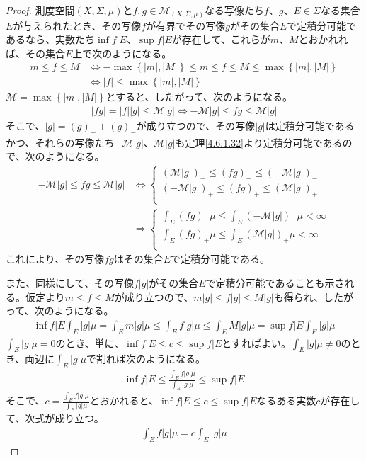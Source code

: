 \documentclass[dvipdfmx]{jsarticle}
\begin{document}
\begin{proof}
測度空間$(X,\varSigma,\mu)$と$f,g \in \mathcal{M}_{(X,\varSigma,\mu)}$なる写像たち$f$、$g$、$E \in \varSigma$なる集合$E$が与えられたとき、その写像$f$が有界でその写像$g$がその集合$E$で定積分可能であるなら、実数たち$\inf{f|E}$、$\sup{f|E}$が存在して、これらが$m$、$M$とおかれれば、その集合$E$上で次のようになる。
\begin{align*}
m \leq f \leq M &\Leftrightarrow - \max\left\{ |m|,|M| \right\} \leq m \leq f \leq M \leq \max\left\{ |m|,|M| \right\}\\
&\Leftrightarrow |f| \leq \max\left\{ |m|,|M| \right\}
\end{align*}
$\mathcal{M}=\max\left\{ |m|,|M| \right\}$とすると、したがって、次のようになる。
\begin{align*}
|fg| = |f||g|\mathcal{\leq M}|g|\mathcal{\Leftrightarrow - M}|g| \leq fg\mathcal{\leq M}|g|
\end{align*}
そこで、$|g| = (g)_{+} + (g)_{-}$が成り立つので、その写像$|g|$は定積分可能であるかつ、それらの写像たち$\mathcal{- M}|g|$、$\mathcal{M}|g|$も定理\ref{4.6.1.32}より定積分可能であるので、次のようになる。
\begin{align*}
-\mathcal{M}|g| \leq fg\mathcal{\leq M}|g| &\Leftrightarrow \left\{ \begin{matrix}
\left( \mathcal{M}|g| \right)_{-} \leq (fg)_{-} \leq \left( \mathcal{- M}|g| \right)_{-} \\
\left( - \mathcal{M}|g| \right)_{+} \leq (fg)_{+} \leq \left( \mathcal{M}|g| \right)_{+} \\
\end{matrix} \right.\ \\
&\Rightarrow \left\{ \begin{matrix}
\int_{E} {(fg)_{-}\mu} \leq \int_{E} {\left( \mathcal{- M}|g| \right)_{-}\mu} < \infty \\
\int_{E} {(fg)_{+}\mu} \leq \int_{E} {\left( \mathcal{M}|g| \right)_{+}\mu} < \infty \\
\end{matrix} \right.
\end{align*}
これにより、その写像$fg$はその集合$E$で定積分可能である。\par
また、同様にして、その写像$f|g|$がその集合$E$で定積分可能であることも示される。仮定より$m \leq f \leq M$が成り立つので、$m|g| \leq f|g| \leq M|g|$も得られ、したがって、次のようになる。
\begin{align*}
\inf{f|E}\int_{E} {|g|\mu} = \int_{E} {m|g|\mu} \leq \int_{E} {f|g|\mu} \leq \int_{E} {M|g|\mu} = \sup{f|E}\int_{E} {|g|\mu}
\end{align*}
$\int_{E} {|g|\mu} = 0$のとき、単に、$\inf{f|E} \leq c \leq \sup{f|E}$とすればよい。$\int_{E} {|g|\mu} \neq 0$のとき、両辺に$\int_{E} {|g|\mu}$で割れば次のようになる。
\begin{align*}
\inf{f|E} \leq \frac{\int_{E} {f|g|\mu}}{\int_{E} {|g|\mu}} \leq \sup{f|E}
\end{align*}
そこで、$c = \frac{\int_{E} {f|g|\mu}}{\int_{E} {|g|\mu}}$とおかれると、$\inf{f|E} \leq c \leq \sup{f|E}$なるある実数$c$が存在して、次式が成り立つ。
\begin{align*}
\int_{E} {f|g|\mu} = c\int_{E} {|g|\mu}
\end{align*}
\end{proof}
\end{document}
